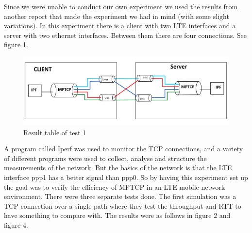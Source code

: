 \documentclass[11pt,twocolumn]{article}
\begin{document}
Since we were unable to conduct our own experiment we used the results from another report that made the experiment we had in mind (with some slight variations). In this experiment there is a client with two LTE interfaces and a server with two ethernet interfaces. Between them there are four connections. See figure 1.

\begin{figure}[ht]
\begin{center}
\includegraphics[scale=0.26]{figure_1}
\caption{Result table of test 1}
\end{center}
\end{figure}

A program called Iperf was used to monitor the TCP connections, and a variety of different programs were used to collect, analyse and structure the measurements of the network. But the basics of the network is that the LTE interface ppp1 has a better signal than ppp0. So by having this experiment set up the goal was to verify the efficiency of MPTCP in an LTE mobile network environment. There were three separate tests done. The first simulation was a TCP connection over a single path where they test the throughput and RTT to have something to compare with. The results were as follows in figure 2 and figure 4.
\end{document}
